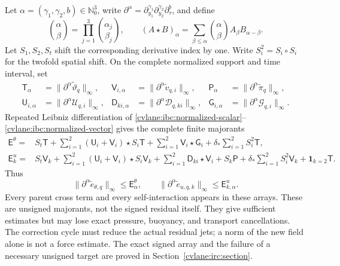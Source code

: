 Let $\alpha=(\gamma_1,\gamma_2,b)\in\mathbb N_0^3$, write
$\partial^\alpha=\partial_{y_1}^{\gamma_1}
\partial_{y_2}^{\gamma_2}\partial_\tau^b$, and define
\[
 \binom\alpha\beta=\prod_{j=1}^3\binom{\alpha_j}{\beta_j},
 \qquad
 (A\star B)_\alpha=\sum_{\beta\leq\alpha}
       \binom\alpha\beta A_\beta B_{\alpha-\beta}.
\]
Let $S_1,S_2,S_t$ shift the corresponding derivative index by one.
Write $S_i^2=S_i\circ S_i$ for the twofold spatial shift.
On the complete normalized support and time interval, set
\begin{align*}
 \mathsf T_\alpha&=\|\partial^\alpha\widetilde\vartheta_q\|_\infty,
 &\mathsf V_{i,\alpha}&=\|\partial^\alpha\widetilde v_{q,i}\|_\infty,
 &\mathsf P_\alpha&=\|\partial^\alpha\widetilde\pi_q\|_\infty,\\
 \mathsf U_{i,\alpha}&=\|\partial^\alpha\mathcal U_{q,i}\|_\infty,
 &\mathsf D_{ki,\alpha}&=\|\partial^\alpha\mathcal D_{q,ki}\|_\infty,
 &\mathsf G_{i,\alpha}&=\|\partial^\alpha\mathcal G_{q,i}\|_\infty.
\end{align*}
Repeated Leibniz differentiation of
\eqref{cvlane:ibc:normalized-scalar}--\eqref{cvlane:ibc:normalized-vector} gives the
complete finite majorants
\begin{align}
 \mathsf E^\theta={}&S_t\mathsf T
 +\sum_{i=1}^2(\mathsf U_i+\mathsf V_i)\star S_i\mathsf T
 +\sum_{i=1}^2\mathsf V_i\star\mathsf G_i
 +\delta_*\sum_{i=1}^2S_i^2\mathsf T,
 \label{cvlane:ibc:scalar-array}\\
 \mathsf E^u_k={}&S_t\mathsf V_k
 +\sum_{i=1}^2(\mathsf U_i+\mathsf V_i)\star S_i\mathsf V_k
 +\sum_{i=1}^2\mathsf D_{ki}\star\mathsf V_i
 +S_k\mathsf P+\delta_*\sum_{i=1}^2S_i^2\mathsf V_k
 +\mathbf1_{k=2}\mathsf T.
 \label{cvlane:ibc:vector-array}
\end{align}
Thus
\begin{equation}\label{cvlane:ibc:array-bound}
 \|\partial^\alpha\widetilde e_{\theta,q}\|_\infty
 \leq\mathsf E^\theta_\alpha,\qquad
 \|\partial^\alpha\widetilde e_{u,q,k}\|_\infty
 \leq\mathsf E^u_{k,\alpha}.
\end{equation}
Every parent cross term and every self-interaction appears in these arrays.
These are unsigned majorants, not the signed residual itself.  They give
sufficient estimates but may lose exact pressure, buoyancy, and transport
cancellations.  The correction cycle must reduce the actual residual jets;
a norm of the new field alone is not a force estimate.  The exact signed
array and the failure of a necessary unsigned target are proved in
Section~\ref{cvlane:irc:section}.

